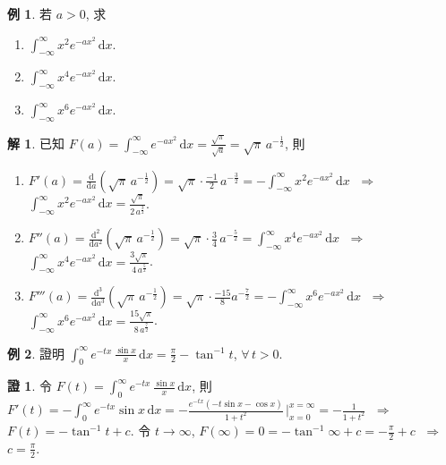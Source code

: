 \documentclass[12pt]{extarticle}
\newcommand{\ds}{\displaystyle}
\newcommand{\ie}{\;\Longrightarrow\;}
\theoremstyle{definition}
\newtheorem*{ex}{例}
\newtheorem*{sol}{解}
\newtheorem*{prf}{證}
\begin{document}
\begin{ex} 若 $a > 0$, 求
  \begin{multicols}{3}
    \begin{enumerate}
      \item $\ds\int_{-\infty}^\infty x^2 e^{-ax^2}\,\text{d}x$. 
      \item $\ds\int_{-\infty}^\infty x^4 e^{-ax^2}\,\text{d}x$.
      \item $\ds\int_{-\infty}^\infty x^6 e^{-ax^2}\,\text{d}x$.
    \end{enumerate}
  \end{multicols}
\end{ex}

\begin{sol} 已知 $\ds F(a) = \int_{-\infty}^\infty e^{-ax^2}\,\mathrm{d}x = \frac{\sqrt{\pi}}{\sqrt{a}} = \sqrt{\pi}\,a^{-\frac{1}{2}}$, 則
  \begin{enumerate}\setlength{\itemsep}{0pt}
    \item $\ds F'(a) = \frac{\mathrm{d}}{\mathrm{d}a}(\sqrt{\pi}\,a^{-\frac{1}{2}}) = \sqrt{\pi}\cdot\frac{-1}{2}\,a^{-\frac{3}{2}} = -\int_{-\infty}^\infty x^2 e^{-ax^2}\,\text{d}x$ $\ie$ $\ds\int_{-\infty}^\infty x^2 e^{-ax^2}\,\text{d}x = \frac{\sqrt{\pi}}{2\,a^{\frac{3}{2}}}$.
    \item $\ds F''(a) = \frac{\mathrm{d}^2}{\mathrm{d}a^2}(\sqrt{\pi}\,a^{-\frac{1}{2}}) = \sqrt{\pi}\cdot\frac{3}{4}\,a^{-\frac{5}{2}} = \int_{-\infty}^\infty x^4 e^{-ax^2}\,\text{d}x$ $\ie$ $\ds\int_{-\infty}^\infty x^4 e^{-ax^2}\,\text{d}x = \frac{3\sqrt{\pi}}{4\,a^{\frac{5}{2}}}$.
    \item $\ds F'''(a) = \frac{\mathrm{d}^3}{\mathrm{d}a^3}(\sqrt{\pi}\,a^{-\frac{1}{2}}) = \sqrt{\pi}\cdot\frac{-15}{8}a^{-\frac{7}{2}} = -\int_{-\infty}^\infty x^6 e^{-ax^2}\,\text{d}x$ $\ie$ $\ds\int_{-\infty}^\infty x^6 e^{-ax^2}\,\text{d}x = \frac{15\sqrt{\pi}}{8\,a^{\frac{7}{2}}}$.
  \end{enumerate}
\end{sol}

\begin{ex}
  證明 $\ds\int_0^\infty\!\!e^{-tx}\,\frac{\sin x}{x}\,\mathrm{d}x = \frac{\pi}{2} - \tan^{-1}t$, $\forall\,t > 0$.
\end{ex}

\begin{prf}
  令 $\ds F(t) = \int_0^\infty\!\!e^{-tx}\,\frac{\sin x}{x}\,\mathrm{d}x$, 則 $\ds F'(t) = -\int_0^\infty\!\!e^{-tx}\sin x\,\mathrm{d}x = -\frac{e^{-tx}(-t\sin x - \cos x)}{1 + t^2}\,\Big|_{x = 0}^{x = \infty} = -\frac{1}{1 + t^2}$ $\ie$ $\ds F(t) = -\tan^{-1}t + c$. 令 $t\to\infty$, $\ds F(\infty) = 0 = -\tan^{-1}\infty + c = -\frac{\pi}{2} + c$ $\ie$ $\ds c = \frac{\pi}{2}$.  
\end{prf}
\end{document}
